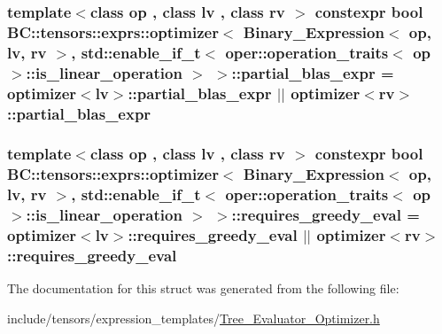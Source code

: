 \subsubsection[{\texorpdfstring{partial\+\_\+blas\+\_\+expr}{partial_blas_expr}}]{\setlength{\rightskip}{0pt plus 5cm}template$<$class op , class lv , class rv $>$ constexpr bool {\bf B\+C\+::tensors\+::exprs\+::optimizer}$<$ {\bf Binary\+\_\+\+Expression}$<$ op, lv, rv $>$, std\+::enable\+\_\+if\+\_\+t$<$ {\bf oper\+::operation\+\_\+traits}$<$ op $>$\+::is\+\_\+linear\+\_\+operation $>$ $>$\+::partial\+\_\+blas\+\_\+expr = {\bf optimizer}$<$lv$>$\+::partial\+\_\+blas\+\_\+expr $\vert$$\vert$ {\bf optimizer}$<$rv$>$\+::partial\+\_\+blas\+\_\+expr\hspace{0.3cm}{\ttfamily [static]}}\hypertarget{structBC_1_1tensors_1_1exprs_1_1optimizer_3_01Binary__Expression_3_01op_00_01lv_00_01rv_01_4_00_f6303e0a787eb8566b71e5cc034a3dd8_a8742d4d0e647e04979b930b428c7e338}{}\label{structBC_1_1tensors_1_1exprs_1_1optimizer_3_01Binary__Expression_3_01op_00_01lv_00_01rv_01_4_00_f6303e0a787eb8566b71e5cc034a3dd8_a8742d4d0e647e04979b930b428c7e338}
\subsubsection[{\texorpdfstring{requires\+\_\+greedy\+\_\+eval}{requires_greedy_eval}}]{\setlength{\rightskip}{0pt plus 5cm}template$<$class op , class lv , class rv $>$ constexpr bool {\bf B\+C\+::tensors\+::exprs\+::optimizer}$<$ {\bf Binary\+\_\+\+Expression}$<$ op, lv, rv $>$, std\+::enable\+\_\+if\+\_\+t$<$ {\bf oper\+::operation\+\_\+traits}$<$ op $>$\+::is\+\_\+linear\+\_\+operation $>$ $>$\+::requires\+\_\+greedy\+\_\+eval = {\bf optimizer}$<$lv$>$\+::requires\+\_\+greedy\+\_\+eval $\vert$$\vert$ {\bf optimizer}$<$rv$>$\+::requires\+\_\+greedy\+\_\+eval\hspace{0.3cm}{\ttfamily [static]}}\hypertarget{structBC_1_1tensors_1_1exprs_1_1optimizer_3_01Binary__Expression_3_01op_00_01lv_00_01rv_01_4_00_f6303e0a787eb8566b71e5cc034a3dd8_a703a9c20070646297f2820860d9a4e35}{}\label{structBC_1_1tensors_1_1exprs_1_1optimizer_3_01Binary__Expression_3_01op_00_01lv_00_01rv_01_4_00_f6303e0a787eb8566b71e5cc034a3dd8_a703a9c20070646297f2820860d9a4e35}


The documentation for this struct was generated from the following file\+:\begin{DoxyCompactItemize}
\item 
include/tensors/expression\+\_\+templates/\hyperlink{Tree__Evaluator__Optimizer_8h}{Tree\+\_\+\+Evaluator\+\_\+\+Optimizer.\+h}\end{DoxyCompactItemize}

